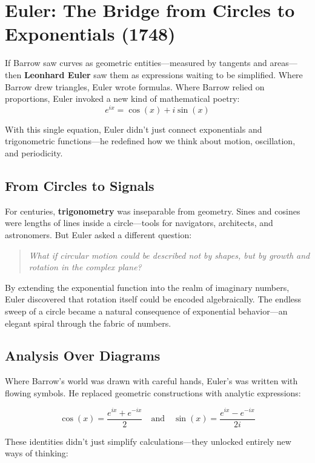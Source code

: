 \section{Euler: The Bridge from Circles to Exponentials (1748)}

If Barrow saw curves as geometric entities—measured by tangents and areas—then \textbf{Leonhard Euler} saw them as expressions waiting to be simplified. Where Barrow drew triangles, Euler wrote formulas. Where Barrow relied on proportions, Euler invoked a new kind of mathematical poetry:  
\[
e^{ix} = \cos(x) + i \sin(x)
\]

With this single equation, Euler didn’t just connect exponentials and trigonometric functions—he redefined how we think about motion, oscillation, and periodicity.

\subsection{From Circles to Signals}

For centuries, \textbf{trigonometry} was inseparable from geometry. Sines and cosines were lengths of lines inside a circle—tools for navigators, architects, and astronomers. But Euler asked a different question:

\begin{quote}
\textit{What if circular motion could be described not by shapes, but by growth and rotation in the complex plane?}
\end{quote}

By extending the exponential function into the realm of imaginary numbers, Euler discovered that rotation itself could be encoded algebraically. The endless sweep of a circle became a natural consequence of exponential behavior—an elegant spiral through the fabric of numbers.

\subsection{Analysis Over Diagrams}

Where Barrow’s world was drawn with careful hands, Euler’s was written with flowing symbols. He replaced geometric constructions with analytic expressions:

\[
\cos(x) = \frac{e^{ix} + e^{-ix}}{2}
\quad \text{and} \quad
\sin(x) = \frac{e^{ix} - e^{-ix}}{2i}
\]

These identities didn’t just simplify calculations—they unlocked entirely new ways of thinking:

